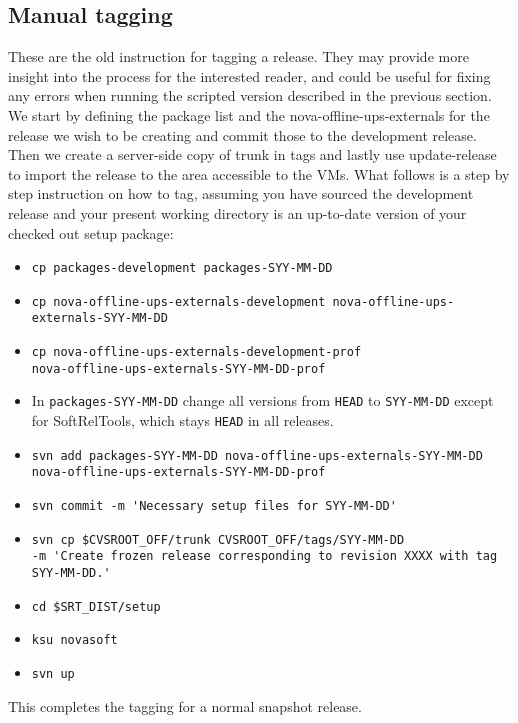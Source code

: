\documentclass[letterpaper,10pt]{article}
\begin{document}
\subsection{Manual tagging}

These are the old instruction for tagging a release. They may provide more insight into the process for the interested reader, and could be useful for fixing any errors when running the scripted version described in the previous section.\\

\noindent
We start by defining the package list and the nova-offline-ups-externals for the release we wish to be creating and commit those to the development release. Then we create a server-side copy of trunk in tags and lastly use update-release to import the release to the area accessible to the VMs. What follows is a step by step instruction on how to tag, assuming you have sourced the development release and your present working directory is an up-to-date version of your checked out setup package:
\begin{itemize}
\item \verb|cp packages-development packages-SYY-MM-DD| 
\item \verb|cp nova-offline-ups-externals-development nova-offline-ups-externals-SYY-MM-DD|
\item \verb|cp nova-offline-ups-externals-development-prof|\\
  \verb|nova-offline-ups-externals-SYY-MM-DD-prof|
\item In \verb|packages-SYY-MM-DD| change all versions from \verb|HEAD| to \verb|SYY-MM-DD| except for SoftRelTools, which stays \verb|HEAD| in all releases.
\item \verb|svn add packages-SYY-MM-DD nova-offline-ups-externals-SYY-MM-DD|\\ \verb|nova-offline-ups-externals-SYY-MM-DD-prof|
\item \verb|svn commit -m 'Necessary setup files for SYY-MM-DD'|
\item \verb|svn cp $CVSROOT_OFF/trunk CVSROOT_OFF/tags/SYY-MM-DD |\\
  \verb|-m 'Create frozen release corresponding to revision XXXX with tag SYY-MM-DD.'|
\item \verb|cd $SRT_DIST/setup|
\item \verb|ksu novasoft|
\item \verb|svn up|
\end{itemize}

This completes the tagging for a normal snapshot release.\\
\end{document}
